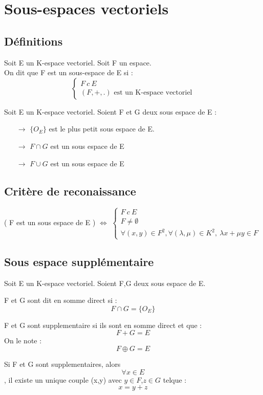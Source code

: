 \section{Sous-espaces vectoriels}
\subsection{Définitions}
\begin{de}
Soit E un K-espace vectoriel. Soit F un espace.\\
On dit que F est un sous-espace de E si :
$$\left\{\begin{array}{l}
   F~ c~ E\\
   (F,+,.) \mbox{ est un K-espace vectoriel}
  \end{array}\right.$$
\end{de}
\begin{prop}
Soit E un K-espace vectoriel. Soient F et G deux sous espace de E :
\begin{itemize}
 \item[$\rightarrow$] $\{ O_E\}$ est le plus petit sous espace de E.
 \item[$\rightarrow$] $F\cap G$ est un sous espace de E
 \item[$\rightarrow$] $F\cup G$ est un sous espace de E 
\end{itemize}
\end{prop}
\subsection{Critère de reconaissance}
\begin{prop}
( F est un sous espace de E ) $\Leftrightarrow$ $\left\{\begin{array}{l}
   F~ c~ E\\
   F \neq \emptyset\\
   \forall(x,y) \in F^2, \forall (\lambda,\mu) \in K^2,~ \lambda x+\mu y \in F
  \end{array}\right.$
\end{prop}
\subsection{Sous espace supplémentaire}
Soit E un K-espace vectoriel. Soient F,G deux sous espace de E.
\begin{de}
 F et G sont dit en somme  direct si : $$F\cap G = \{ O_E \}$$
\end{de}
\begin{de}
 F et G sont supplementaire si ils sont en somme direct et que :  $$F + G = E$$
On le note : $$F \oplus G = E$$
\end{de}
\begin{prop}
Si F et G sont supplementaires, alors $$\forall x \in E$$, il existe un unique couple (x,y) avec $y\in F$,$z \in G$ telque : $$x = y+z$$
\end{prop}
